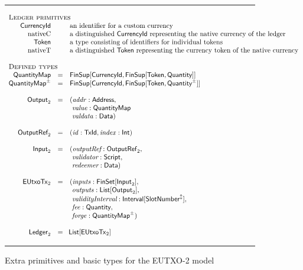 \documentclass[a4paper]{article}
\renewcommand{\i}{\textit}  %
\newcommand{\s}{\textsf}  %
\newcommand{\msf}[1]{\ensuremath{\mathsf{#1}}}
\newcommand{\mi}[1]{\ensuremath{\mathit{#1}}}
\newcommand\rfskip{7pt}
\newenvironment{ruledfigure}[1]{\begin{figure}[#1]\hrule\vspace{\rfskip}}{\vspace{\rfskip}\hrule\end{figure}}
\newcommand{\List}[1]{\ensuremath{\s{List}[#1]}}
\newcommand{\FinSet}[1]{\ensuremath{\s{FinSet}[#1]}}
\newcommand{\Interval}[1]{\ensuremath{\s{Interval}[#1]}}
\newcommand{\extended}[1]{#1^\updownarrow}
\newcommand{\FinSup}[2]{\ensuremath{\s{FinSup}[#1,#2]}}
\newcommand{\script}{\ensuremath{\s{Script}}}
\newcommand{\txrefid}{\mi{id}}
\newcommand{\idx}{\mi{index}}
\newcommand{\inputs}{\mi{inputs}}
\newcommand{\outputs}{\mi{outputs}}
\newcommand{\forge}{\mi{forge}}
\newcommand{\fee}{\mi{fee}}
\newcommand{\addr}{\mi{addr}}
\newcommand{\val}{\mi{value}}  %
\newcommand{\valdata}{\mi{valdata}}
\newcommand{\Data}{\ensuremath{\s{Data}}}
\newcommand{\slotnum}{\ensuremath{\s{SlotNumber}}}
\newcommand{\eutxotx}{\msf{EUtxoTx}}
\newcommand{\qty}{\ensuremath{\s{Quantity}}}
\newcommand{\qtypm}{\ensuremath{\s{Quantity}^{\pm}}}
\newcommand{\token}{\ensuremath{\s{Token}}}
\newcommand{\currency}{\ensuremath{\s{CurrencyId}}}
\newcommand{\nativeCur}{\ensuremath{\mathrm{nativeC}}}
\newcommand{\nativeTok}{\ensuremath{\mathrm{nativeT}}}
\newcommand{\qtymap}{\ensuremath{\s{QuantityMap}}}
\newcommand{\qtymappm}{\ensuremath{\s{QuantityMap}^{\pm}}}
\begin{document}
\begin{ruledfigure}{H}
  \begin{displaymath}
    \begin{array}{rll}
    \multicolumn{3}{l}{\textsc{Ledger primitives}}\\
    \currency  && \mbox{an identifier for a custom currency}\\
    \nativeCur && \mbox{a distinguished \currency{} representing the native currency of the ledger}\\
    \token     && \mbox{a type consisting of identifiers for individual tokens}\\
    \nativeTok && \mbox{a distinguished \token{} representing the currency token of the native currency}\\
    \\
    \multicolumn{3}{l}{\textsc{Defined types}}\\
    \qtymap   &=& \FinSup{\currency}{\FinSup{\token}{\qty}}\\
    \qtymappm &=& \FinSup{\currency}{\FinSup{\token}{\qtypm}}\\
    \\
    \s{Output}_2 &=&(\addr: \s{Address},\\
                 & &\ \val: \qtymap\\
                 & &\ \valdata: \Data)\\
    \\
    \s{OutputRef}_2 &= &(\txrefid: \s{TxId}, \idx: \s{Int})\\
    \\
    \s{Input}_2 &=&( \i{outputRef}: \sf{OutputRef}_2,\\
                & &\ \i{validator}: \script,\\
                & &\ \i{redeemer}: \Data)\\
    \\
    \eutxotx_2 &=&(\inputs: \FinSet{\s{Input}_2},\\
               & &\ \outputs: \List{\s{Output}_2},\\
               & &\ \i{validityInterval}: \Interval{\extended{\slotnum}},\\
               & &\ \fee: \qty,\\
               & &\ \forge: \qtymap^{\pm})\\
    \\
    \s{Ledger}_2 &=&\!\List{\eutxotx_2}\\
    \end{array}
  \end{displaymath}
  \caption{Extra primitives and basic types for the EUTXO-2 model}
  \label{fig:eutxo-2-types}
\end{ruledfigure}
\end{document}
